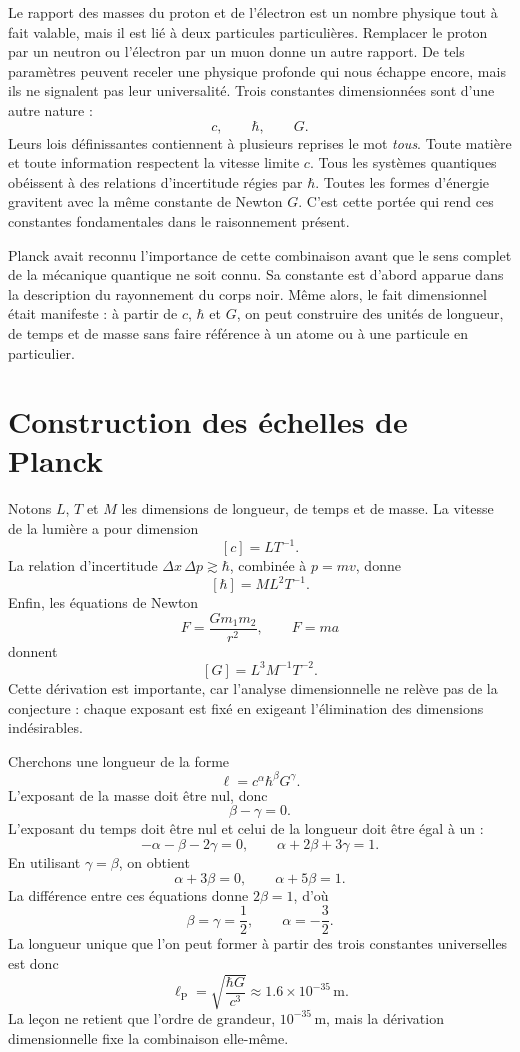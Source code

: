 Le rapport des masses du proton et de l’électron est un nombre physique tout à fait valable, mais il est lié à deux particules particulières. Remplacer le proton par un neutron ou l’électron par un muon donne un autre rapport. De tels paramètres peuvent receler une physique profonde qui nous échappe encore, mais ils ne signalent pas leur universalité. Trois constantes dimensionnées sont d’une autre nature :
\[
c,\qquad \hbar,\qquad G.
\]
Leurs lois définissantes contiennent à plusieurs reprises le mot \emph{tous}. Toute matière et toute information respectent la vitesse limite \(c\). Tous les systèmes quantiques obéissent à des relations d’incertitude régies par \(\hbar\). Toutes les formes d’énergie gravitent avec la même constante de Newton \(G\). C’est cette portée qui rend ces constantes fondamentales dans le raisonnement présent.

Planck avait reconnu l’importance de cette combinaison avant que le sens complet de la mécanique quantique ne soit connu. Sa constante est d’abord apparue dans la description du rayonnement du corps noir. Même alors, le fait dimensionnel était manifeste : à partir de \(c\), \(\hbar\) et \(G\), on peut construire des unités de longueur, de temps et de masse sans faire référence à un atome ou à une particule en particulier.

\section{Construction des échelles de Planck}

Notons \(L\), \(T\) et \(M\) les dimensions de longueur, de temps et de masse. La vitesse de la lumière a pour dimension
\[
[c]=LT^{-1}.
\]
La relation d’incertitude \(\Delta x\,\Delta p\gtrsim\hbar\), combinée à \(p=mv\), donne
\[
[\hbar]=ML^2T^{-1}.
\]
Enfin, les équations de Newton
\[
F=\frac{Gm_1m_2}{r^2},
\qquad
F=ma
\]
donnent
\[
[G]=L^3M^{-1}T^{-2}.
\]
Cette dérivation est importante, car l’analyse dimensionnelle ne relève pas de la conjecture : chaque exposant est fixé en exigeant l’élimination des dimensions indésirables.

Cherchons une longueur de la forme
\begin{equation}
\ell=c^\alpha\hbar^\beta G^\gamma.
\label{eq:c10-length-ansatz}
\end{equation}
L’exposant de la masse doit être nul, donc
\[
\beta-\gamma=0.
\]
L’exposant du temps doit être nul et celui de la longueur doit être égal à un :
\[
-\alpha-\beta-2\gamma=0,
\qquad
\alpha+2\beta+3\gamma=1.
\]
En utilisant \(\gamma=\beta\), on obtient
\[
\alpha+3\beta=0,
\qquad
\alpha+5\beta=1.
\]
La différence entre ces équations donne \(2\beta=1\), d’où
\[
\beta=\gamma=\frac12,
\qquad
\alpha=-\frac32.
\]
La longueur unique que l’on peut former à partir des trois constantes universelles est donc
\begin{equation}
\ell_{\mathrm P}
=\sqrt{\frac{\hbar G}{c^3}}
\approx 1.6\times10^{-35}\,\mathrm m.
\label{eq:c10-planck-length}
\end{equation}
La leçon ne retient que l’ordre de grandeur, \(10^{-35}\,\mathrm m\), mais la dérivation dimensionnelle fixe la combinaison elle-même.

